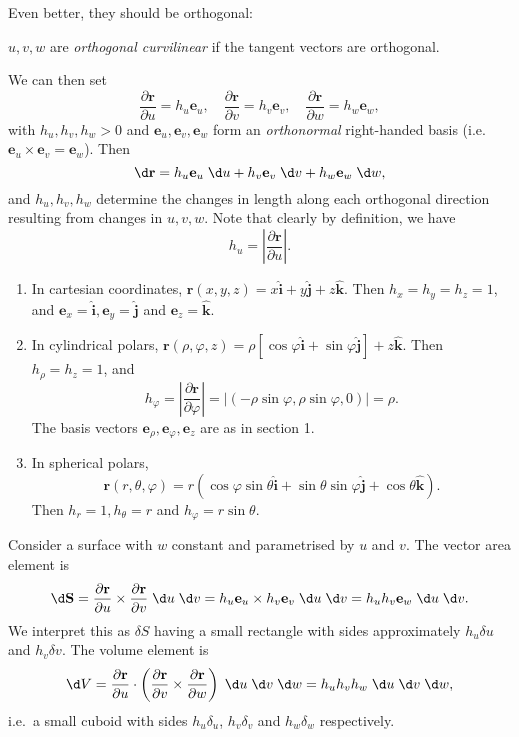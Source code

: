 \documentclass[a4paper]{article}
\begin{document}
Even better, they should be orthogonal:
\begin{defi}
  $u, v, w$ are \emph{orthogonal curvilinear} if the tangent vectors are orthogonal.
\end{defi}
We can then set
\[
  \frac{\partial \mathbf{r}}{\partial u} = h_u \mathbf{e}_u, \quad \frac{\partial \mathbf{r}}{\partial v} = h_v \mathbf{e}_v,\quad \frac{\partial \mathbf{r}}{\partial w} = h_w \mathbf{e}_w,
\]
with $h_u, h_v, h_w > 0$ and $\mathbf{e}_u, \mathbf{e}_v, \mathbf{e}_w$ form an \emph{orthonormal} right-handed basis (i.e.\ $\mathbf{e}_u \times \mathbf{e}_v = \mathbf{e}_w$). Then
\[
  \d \mathbf{r} = h_u \mathbf{e}_u \;\d u + h_v \mathbf{e}_v\;\d v + h_w\mathbf{e}_w \;\d w,
\]
and $h_u, h_v, h_w$ determine the changes in length along each orthogonal direction resulting from changes in $u, v, w$. Note that clearly by definition, we have
\[
  h_u = \left|\frac{\partial \mathbf{r}}{\partial u}\right|.
\]
\begin{eg}\leavevmode
  \begin{enumerate}
    \item In cartesian coordinates, $\mathbf{r}(x, y, z) = x\hat{\mathbf{i}} + y\hat{\mathbf{j}} + z\hat{\mathbf{k}}$. Then $h_x = h_y = h_z = 1$, and $\mathbf{e}_x = \hat{\mathbf{i}}, \mathbf{e}_y = \hat{\mathbf{j}}$ and $\mathbf{e}_z = \hat{\mathbf{k}}$.
    \item In cylindrical polars, $\mathbf{r}(\rho, \varphi, z) = \rho[\cos \varphi\hat{\mathbf{i}} + \sin \varphi \hat{\mathbf{j}}] + z \hat{\mathbf{k}}$. Then $h_\rho = h_z = 1$, and
      \[
        h_\varphi = \left|\frac{\partial \mathbf{r}}{\partial \varphi}\right| = |(-\rho \sin\varphi, \rho \sin \varphi, 0)| = \rho.
      \]
      The basis vectors $\mathbf{e}_\rho, \mathbf{e}_\varphi, \mathbf{e}_z$ are as in section 1.
    \item In spherical polars,
      \[
        \mathbf{r}(r, \theta, \varphi) = r(\cos \varphi\sin \theta\hat{\mathbf{i}} + \sin \theta\sin \varphi\hat{\mathbf{j}} + \cos \theta \hat{\mathbf{k}}).
      \]
      Then $h_r = 1, h_\theta = r$ and $h_\varphi = r\sin \theta$.
  \end{enumerate}
\end{eg}

Consider a surface with $w$ constant and parametrised by $u$ and $v$. The vector area element is
\[
  \d \mathbf{S} = \frac{\partial \mathbf{r}}{\partial u}\times \frac{\partial \mathbf{r}}{\partial v}\;\d u\;\d v = h_u \mathbf{e}_u \times h_v \mathbf{e}_v \;\d u\;\d v = h_uh_v \mathbf{e}_w \;\d u\;\d v.
\]
We interpret this as $\delta S$ having a small rectangle with sides approximately $h_u \delta u$ and $h_v \delta v$. The volume element is
\[
  \d V = \frac{\partial \mathbf{r}}{\partial u}\cdot \left(\frac{\partial \mathbf{r}}{\partial v}\times \frac{\partial \mathbf{r}}{\partial w}\right)\;\d u\;\d v\;\d w = h_uh_vh_w \;\d u\;\d v\;\d w,
\]
i.e.\ a small cuboid with sides $h_u \delta _u$, $h_v\delta _v$ and $h_w \delta_w$ respectively.
\end{document}
